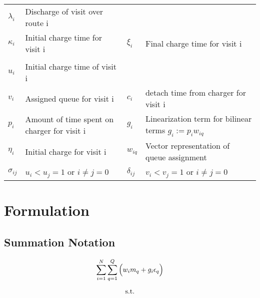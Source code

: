 \documentclass[conference]{IEEEtran}
\begin{document}
\begin{table*}[!t]
\begin{tabular}{l l l l}
			$\lambda_i$  & \textrm{Discharge of visit over route } i                                              \\
			$\kappa_i$   & \textrm{Initial charge time for visit } i                                            &
			$\xi_i$      & \textrm{Final charge time for visit } i                                                \\
		\hline
		\multicolumn{4}{l}{} \\
			$u_i$         & \textrm{Initial charge time of visit } i                                  \\
			$v_i$         & \textrm{Assigned queue for visit } i                                         &
			$c_i$         & \textrm{detach time from charger for  visit } i                           \\
			$p_i$         & \textrm{Amount of time spent on charger for visit } i                        &
			$g_i$         & \textrm{Linearization term for bilinear terms } $g_i := p_i w_{iq}$       \\
			$\eta_i$      & \textrm{Initial charge for visit } i                                         &
			$w_{iq}$      & \textrm{Vector representation of queue assignment}                        \\
			$\sigma_{ij}$ & $u_i < u_j = 1$ \textrm{ or } $i \neq j = 0$                                 &
			$\delta_{ij}$ & $v_i < v_j = 1$ \textrm{ or } $i \neq j = 0$                              \\
			\bottomrule
	\end{tabular}
\end{table*}


\section{Formulation}\label{formulation}

\subsection{Summation Notation}\label{summation-notation}

\begin{equation}\label{eq:objective}
    \sum_{i=1}^N \sum_{q=1}^Q \Big( w_i m_q + g_i \epsilon_q \Big)           \\
\end{equation}

\begin{equation*}
    \textrm{s.t.}                                                \\
\end{equation*}
\end{document}
